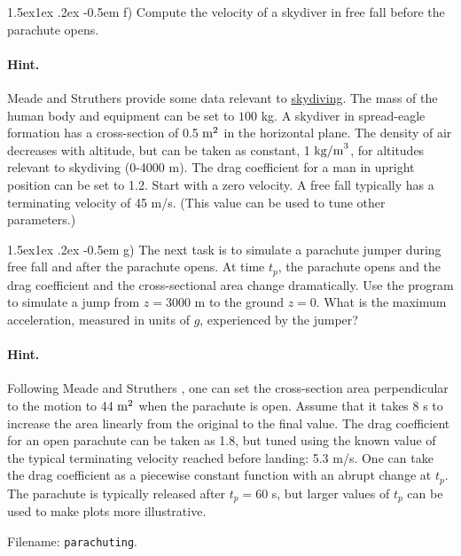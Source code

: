 \documentclass[%
oneside,                 %
final,                   %
10pt]{article}
\makeatletter
\newenvironment{doconceexercise}{}{}
\newcommand\subex{\@startsection{paragraph}{4}{\z@}%
                  {1.5ex\@plus1ex \@minus.2ex}%
                  {-0.5em}%
                  {\normalfont\normalsize\bfseries}}
\makeatother
\begin{document}
\begin{doconceexercise}

\subex{f)}
Compute the velocity of
a skydiver in free fall before the parachute opens.


\paragraph{Hint.}
Meade and Struthers \cite{parachute_1999} provide some data relevant
to \href{{http://en.wikipedia.org/wiki/Parachuting}}{skydiving}.
The mass of the human body and equipment
can be set to $100$ kg.
A skydiver in spread-eagle formation has a cross-section of 0.5 $\hbox{m}^2$
in the horizontal plane.
The density of air decreases with altitude, but can be taken
as constant, 1 $\hbox{kg/m}^3$, for altitudes relevant to
skydiving (0-4000 m).
The drag coefficient for a man in upright position can be set to 1.2.
Start with a zero velocity.
A free fall typically has a terminating velocity of 45 m/s. (This value
can be used to tune other parameters.)


\subex{g)}
The next task is to simulate
a parachute jumper during free fall and after the parachute opens.
At time $t_p$, the parachute opens and
the drag coefficient and the cross-sectional
area change dramatically.
Use the program to simulate a jump from $z=3000$ m to the ground $z=0$.
What is the maximum acceleration, measured in units of $g$,
experienced by the jumper?


\paragraph{Hint.}
Following Meade and Struthers \cite{parachute_1999}, one can set the
cross-section area perpendicular to the motion to 44 $\hbox{m}^2$
when the parachute is open. Assume that it takes 8 s to increase
the area linearly from the original to the final value.
The drag coefficient for an open
parachute can be taken as 1.8, but tuned using the known value
of the typical terminating velocity reached before landing:
5.3 m/s. One can take the drag coefficient as a piecewise constant
function with an abrupt change at $t_p$.
The parachute is typically released after $t_p=60$ s, but
larger values of $t_p$ can be used to make plots more illustrative.


\noindent Filename: \texttt{parachuting}.

\end{doconceexercise}
\end{document}

